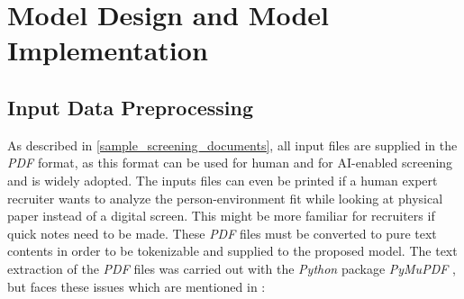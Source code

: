 \documentclass[draft,final]{thesisclass} %
\begin{document}
\section{Model Design and Model Implementation} \label{implementation}

\subsection{Input Data Preprocessing}
As described in \ref{sample_screening_documents}, all input files are supplied in the \textit{PDF} format, as this format can be used for human and for \acs{AI}-enabled screening and is widely adopted.
The inputs files can even be printed if a human expert recruiter wants to analyze the person-environment fit while looking at physical paper instead of a digital screen.
This might be more familiar for recruiters if quick notes need to be made.
These \textit{PDF} files must be converted to pure text contents in order to be tokenizable and supplied to the proposed model.
The text extraction of the \textit{PDF} files was carried out with the \textit{Python} package \textit{PyMuPDF} \parencite{pymupdf}, but faces these issues which are mentioned in \textcite{pymupdf}:
\end{document}

